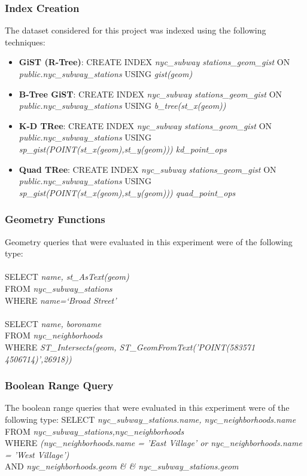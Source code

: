 \documentclass{sig-alternate-05-2015}
\begin{document}
\subsubsection{Index Creation}
The dataset considered for this project was indexed using the following techniques:
\begin{itemize}
\item \textbf{GiST (R-Tree)}: CREATE INDEX \textit{nyc_subway stations_geom_gist} ON \textit{public.nyc_subway_stations} USING \textit{gist(geom)}
\item \textbf{B-Tree GiST}: CREATE INDEX \textit{nyc_subway stations_geom_gist} ON \textit{public.nyc_subway_stations} USING \textit{b_tree(st_x(geom))}
\item \textbf{K-D TRee}: CREATE INDEX \textit{nyc_subway stations_geom_gist} ON \textit{public.nyc_subway_stations} USING \textit{sp_gist(POINT(st_x(geom),st_y(geom))) kd_point_ops} 
\item \textbf{Quad TRee}: CREATE INDEX \textit{nyc_subway stations_geom_gist} ON \textit{public.nyc_subway_stations} USING \textit{sp_gist(POINT(st_x(geom),st_y(geom))) quad_point_ops} 
\end{itemize}
\subsubsection{Geometry Functions}
Geometry queries that were evaluated in this experiment were of the following type:\\\\
SELECT \textit{name, st_AsText(geom)}\\ 
FROM \textit{nyc_subway_stations} \\
WHERE \textit{name=`Broad Street'} \\\\
SELECT \textit{name, boroname} \\
FROM \textit{nyc_neighborhoods}\\
WHERE \textit{ST_Intersects(geom, ST_GeomFromText('POINT(583571 4506714)',26918))}
\subsubsection{Boolean Range Query}
The boolean range queries that were evaluated in this experiment were of the following type:
SELECT \textit{nyc_subway_stations.name, nyc_neighborhoods.name} \\
FROM \textit{nyc_subway_stations,nyc_neighborhoods} \\
WHERE \textit{(nyc_neighborhoods.name = 'East Village' or nyc_neighborhoods.name = 'West Village')} \\
AND \textit{nyc_neighborhoods.geom \& \& nyc_subway_stations.geom}
\end{document}
